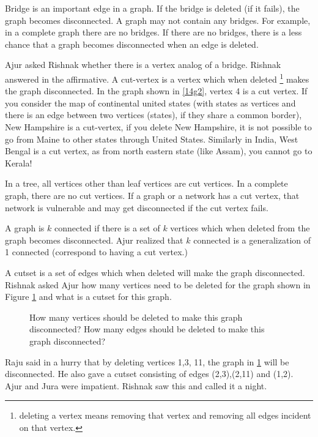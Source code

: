 Bridge is an important edge in a graph. If the bridge is deleted (if it fails), the graph becomes disconnected. A graph may not contain any bridges. For example, in a complete graph there are no
bridges. If there are no bridges, there is a less chance that a graph becomes disconnected when an edge is deleted.

Ajur asked Rishnak whether there is a vertex analog of a bridge. Rishnak answered in the affirmative. A cut-vertex is a vertex which when deleted \footnote{deleting a vertex means removing that vertex and removing all edges incident on that vertex.} makes the graph disconnected. In the graph shown in \ref{14g2}, vertex 4 is a cut vertex. If you consider the map of continental united states (with states as vertices and there is an edge between two vertices (states), if they share a common border), New Hampshire is a cut-vertex, if you delete New Hampshire, it is not possible to go from Maine to other states through United States. Similarly in India, West Bengal is  a cut vertex, as from north eastern state (like Assam), you cannot go to Kerala!

In a tree, all vertices other than leaf vertices are cut vertices. In a complete graph, there are no cut vertices. If a graph or a network has a cut vertex, that network is vulnerable and may get disconnected if the cut vertex fails. 

A graph is $k$ connected if there is a set of $k$ vertices which when deleted from the graph becomes disconnected. Ajur realized that $k$ connected is a generalization of 1 connected (correspond to having a cut vertex.)

A cutset is a set of edges which when deleted will make the graph disconnected. Rishnak asked Ajur how many vertices need to be deleted for the graph shown in Figure \ref{14g3} and what is a cutset for this graph.

\begin{figure}
\begin{center}

\caption{How many vertices should be deleted to make this graph disconnected? How many edges should be deleted to make this graph disconnected? }\label{14g3}
\end{center}
\end{figure}

Raju said in a hurry that by deleting vertices 1,3, 11, the graph in \ref{14g3} will be disconnected. He
also gave a cutset consisting of edges (2,3),(2,11) and (1,2). Ajur and Jura were impatient. Rishnak saw this and called it a night.